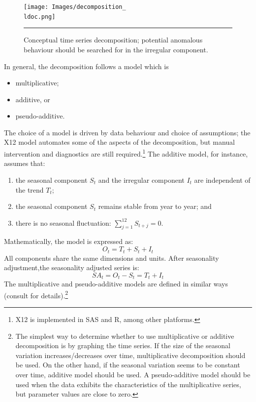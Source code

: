\begin{Example}
\begin{figure}[t]
\centering
\texttt{[image: Images/decomposition\_\\ldoc.png]}
\caption{\small Conceptual time series decomposition; potential anomalous behaviour should be searched for in the irregular component.}\hrule \label{fig:description}
\end{figure}
\newl In general, the decomposition follows a model which is 
\begin{itemize}[noitemsep]
\item multiplicative;
\item additive, or 
\item pseudo-additive.
\end{itemize}
The choice of a model is driven by data behaviour and choice of assumptions; the X12 model automates some of the aspects of the decomposition, but manual intervention and diagnostics are still required.\footnote{X12 is implemented in SAS and R, among other platforms.}
The additive model, for instance, assumes that: 
\begin{enumerate}[noitemsep]\item the seasonal component $S_t$ and the irregular component $I_t$ are independent of the trend $T_t$; \item  the seasonal component $S_t$ remains stable from year to year; and \item there is no seasonal fluctuation: $\sum_{j=1}^{12} S_{t+j}=0 $.\end{enumerate} 
Mathematically, the model is expressed as:
    \begin{equation*}
        O_t = T_t + S_t + I_t
    \end{equation*}
    All components share the same dimensions and units. After seasonality adjustment,the seasonality adjusted series is:
    \begin{equation*}
        SA_t = O_t - S_t = T_t + I_t
    \end{equation*}
The multiplicative and pseudo-additive models are defined in similar ways (consult \cite{TS_FH,TS_FMBOC,TS_ICTSA,TS_SAETS,TS_JL} for details).\footnote{The simplest way to determine whether to use multiplicative or additive decomposition is by graphing the time series. If the size of the seasonal variation increases/decreases over time, multiplicative decomposition should be used. On the other hand, if the seasonal variation seems to be constant over time, additive model should be used. A pseudo-additive model should be used when the data exhibits the characteristics of the multiplicative series, but parameter values are close to zero.}\newl 

\end{Example}
